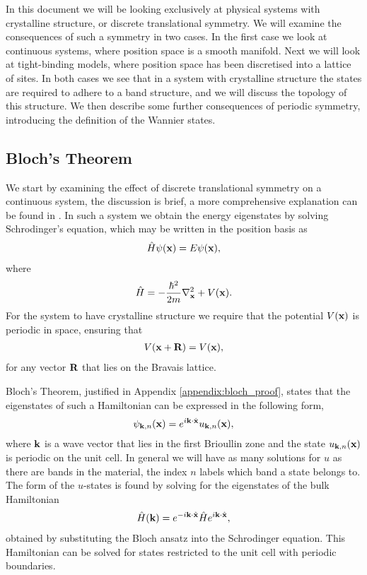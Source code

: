 


In this document we will be looking exclusively at physical systems with crystalline structure, or discrete translational symmetry. We will examine the consequences of such a symmetry in two cases. In the first case we look at continuous systems, where position space is a smooth manifold.  Next we will look at tight-binding models, where position space has been discretised into a lattice of sites. In both cases we see that in a system with crystalline structure the states are required to adhere to a band structure, and we will discuss the topology of this structure. We then describe some further consequences of periodic symmetry, introducing the definition of the Wannier states. \par

\subsection{Bloch's Theorem}
We start by examining the effect of discrete translational symmetry on a continuous system, the discussion is brief, a more comprehensive explanation can be found in \cite{simon_oxford_2013}. In such a system we obtain the energy eigenstates by solving Schrodinger's equation, which may be written in the position basis as
\begin{align}
     \hat H \psi(\bf x) = E \psi (\bf x),
\end{align}
where
\begin{align}
    \hat H = -\frac{\hbar^2}{2m}\nabla_{\bf{x}}^2 + V(\bf{x} ).
\end{align}
For the system to have crystalline structure we require that the potential $V(\bf x)$ is periodic in space, ensuring that
\begin{align}
    V(\bf x + \bf R) = V(\bf x),
\end{align}
for any vector $\bf R$ that lies on the Bravais lattice. \par
Bloch's Theorem, justified in Appendix \ref{appendix:bloch_proof}, states that the eigenstates of such a Hamiltonian can be expressed in the following form,
\begin{align}\label{eqn:bloch_states}
    \psi_{\bf k ,n }(\bf{x} )  = e^{i\bf{k}\cdot \hat{\bf{x}}}  u_{\bf k ,n }(\bf{x} ) ,
\end{align}
where $\bf k$ is a wave vector that lies in the first Brioullin zone and the state $u_{\bf k ,n }(\bf{x} )$ is periodic on the unit cell. In general we will have as many solutions for $u$ as there are bands in the material, the index $n$ labels which band a state belongs to. The form of the $u$-states is found by solving for the eigenstates of the bulk Hamiltonian
\begin{align}\label{eqn:bulk_hamiltonian}
    \hat H(\bf{k}) = e^{-i \bf{k} \cdot \hat{\bf{x}}} \hat H e^{i \bf{k} \cdot \hat{\bf{x}}},
\end{align}
obtained by substituting the Bloch ansatz into the Schrodinger equation. This Hamiltonian can be solved for states restricted to the unit cell with periodic boundaries.

